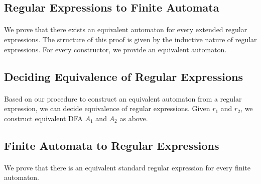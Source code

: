                         \subsection{Regular Expressions to Finite Automata}

                        \paragraph{} 
                        We prove that there exists an equivalent automaton for every extended regular expressions.
                        The structure of this proof is given by the inductive nature of regular expressions.
                        For every constructor, we provide an equivalent automaton.


                        \subsection{Deciding Equivalence of Regular Expressions}

                        \paragraph{} 
                        Based on our procedure to construct an equivalent automaton from a regular expression, we can decide equivalence of regular expressions. Given $r_1$ and $r_2$, we construct equivalent DFA $A_1$ and $A_2$ as above.


                        \subsection{Finite Automata to Regular Expressions}
                        \paragraph{}
                        We prove that there is an equivalent standard regular expression for every finite automaton.


